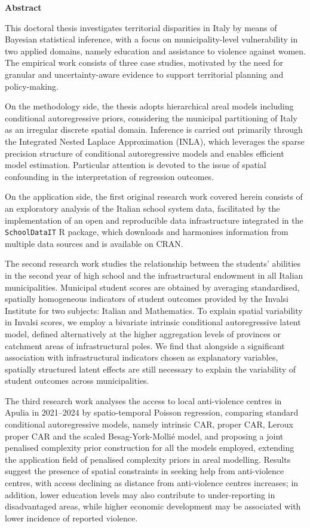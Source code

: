 \documentclass[openany, 11pt, oneside]{book}
\newenvironment{thesisabstract}{
  \clearpage
  \phantomsection

  \begin{center}
    {\Large\bfseries Abstract}
  \end{center}
  \vspace{0.6\baselineskip}

  \begingroup
  \small                
  \setstretch{1.05}
  \setlength{\parindent}{1.2em}
  \setlength{\parskip}{0.35em}
  \setlength{\emergencystretch}{2em} %
}{
  \par
  \endgroup
}
\begin{document}
\begin{thesisabstract}
This doctoral thesis investigates territorial disparities in Italy by means of Bayesian statistical inference, with a focus on municipality-level vulnerability in two applied domains, namely education and assistance to violence against women. The empirical work consists of three case studies, motivated by the need for granular and uncertainty-aware evidence to support territorial planning and policy-making.

On the methodology side, the thesis adopts hierarchical areal models including conditional autoregressive priors, considering the municipal partitioning of Italy as an irregular discrete spatial domain. Inference is carried out primarily through the Integrated Nested Laplace Approximation (INLA), which leverages the sparse precision structure of conditional autoregressive models and enables efficient model estimation. Particular attention is devoted to the issue of spatial confounding in the interpretation of regression outcomes.

On the application side, the first original research work covered herein consists of an exploratory analysis of the Italian school system data, facilitated by the implementation of an open and reproducible data infrastructure integrated in the \texttt{SchoolDataIT} R package, which downloads and harmonises information from multiple data sources and is available on CRAN.

The second research work studies the relationship between the students' abilities in the second year of high school and the infrastructural endowment in all Italian municipalities. Municipal student scores are obtained by averaging standardised, spatially homogeneous indicators of student outcomes provided by the Invalsi Institute for two subjects: Italian and Mathematics. To explain spatial variability in Invalsi scores, we employ a bivariate intrinsic conditional autoregressive latent model, defined alternatively at the higher aggregation levels of provinces or catchment areas of infrastructural poles. We find that alongside a significant association with infrastructural indicators chosen as explanatory variables, spatially structured latent effects are still necessary to explain the variability of student outcomes across municipalities.

The third research work analyses the access to local anti-violence centres in Apulia in 2021--2024 by spatio-temporal Poisson regression, comparing standard conditional autoregressive models, namely intrinsic CAR, proper CAR, Leroux proper CAR and the scaled Besag-York-Mollié model, and proposing a joint penalised complexity prior construction for all the models employed, extending the application field of penalised complexity priors in areal modelling. Results suggest the presence of spatial constraints in seeking help from anti-violence centres, with access declining as distance from anti-violence centres increases; in addition, lower education levels may also contribute to under-reporting in disadvantaged areas, while higher economic development may be associated with lower incidence of reported violence.


\end{thesisabstract}
\end{document}
